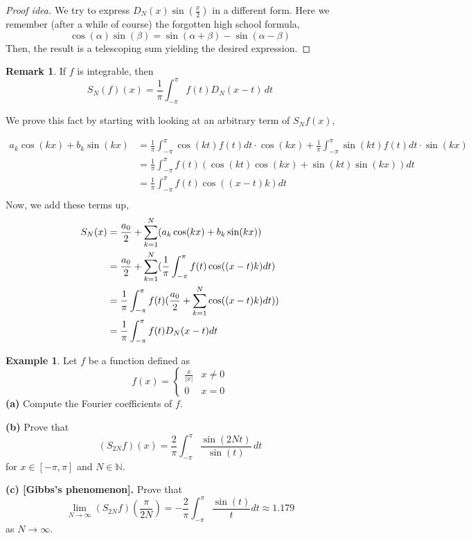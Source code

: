 \documentclass[12pt]{amsart}
\theoremstyle{definition}
\newtheorem{example}[theorem]{Example}
\newtheorem{remark}[theorem]{Remark}
\begin{document}
\begin{proof}[Proof idea] We try to express  $D_N(x)\sin(\frac{x}{2})$ in a different form. Here we remember (after a while of course) the forgotten high school formula,
\[
\cos(\alpha)\sin(\beta) = \sin(\alpha + \beta) - \sin(\alpha - \beta)
\]
    Then, the result is a telescoping sum yielding the desired expression.
\end{proof}



     \begin{remark}
         If \(f\) is integrable, then
    \[
    S_N(f)(x) = \frac{1}{\pi}\int_{-\pi}^{\pi}f(t)D_N(x-t)\,dt
    \]
     \end{remark}


        We prove this fact by starting with looking at an arbitrary term of $S_Nf(x)$,

        \begin{align*}
            a_k\cos(kx) + b_k\sin(kx) &= \frac{1}{\pi}\int_{-\pi}^{\pi}\cos(kt)f(t)dt \cdot \cos(kx) + \frac{1}{\pi}\int_{-\pi}^{\pi}\sin(kt)f(t)dt \cdot \sin(kx)\\
        &= \frac{1}{\pi}\int_{-\pi}^{\pi}f(t)(\cos(kt)\cos(kx) + \sin(kt)\sin(kx))dt\\
        &= \frac{1}{\pi}\int_{-\pi}^{\pi}f(t)\cos((x-t)k)dt\\
        \end{align*}
        Now, we add these terms up,
        \begin{align*}
            S_N(x) &=\frac{a_0}{2} + \sum_{k=1}^{N} (a_k\cos(kx) + b_k\sin(kx))\\
            &= \frac{a_0}{2} + \sum_{k=1}^{N}(\frac{1}{\pi}\int_{-\pi}^{\pi}f(t)\cos((x-t)k)dt) \\
            &= \frac{1}{\pi}\int_{-\pi}^{\pi}f(t) (\frac{a_0}{2} + \sum_{k=1}^{N}\cos((x-t)k)dt)) \\
            &= \frac{1}{\pi}\int_{-\pi}^{\pi}f(t)D_N(x-t)dt \qedhere
        \end{align*}

     \begin{example}
     Let \(f\) be a function defined as
    \[
    f(x) = \begin{cases}
        \frac{x}{|x|} & x \neq 0\\
        0             & x = 0
    \end{cases}
    \]
    \textbf{(a)} Compute the Fourier coefficients of $f$.

    \textbf{(b)} Prove that
    \[
    (S_{2N} f)(x) = \frac{2}{\pi} \int_{-\pi}^{\pi} \frac{\sin(2Nt)}{\sin(t)} \,dt
    \]
    for $x \in [-\pi,\pi]$ and $N \in \mathbb{N}$.

    \textbf{(c) [Gibbs's phenomenon].} Prove that
    \[
    \lim_{N \to \infty}(S_{2N} f)(\frac{\pi}{2N}) = -\frac{2}{\pi}\int_{-\pi}^{\pi} \frac{\sin(t)}{t} dt \approx 1.179
    \]
    as $N \to \infty$.
     \end{example}
\end{document}
